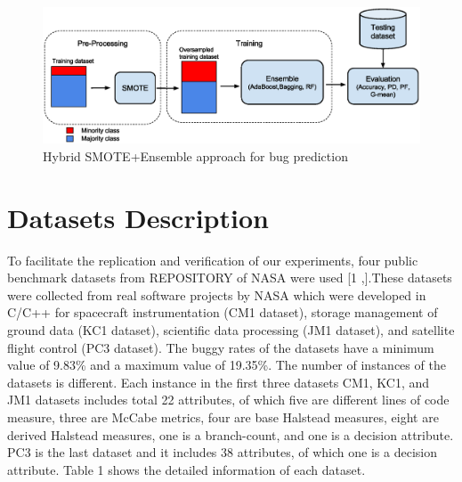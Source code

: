 \documentclass[runningheads,a4paper]{llncs}
\begin{document}
 \begin{figure}[h]
\label{fig:ss}
\begin{center}
\includegraphics[scale=0.45]{Framework.eps}
\caption{Hybrid SMOTE+Ensemble approach for bug prediction}
\end{center}
\label{fig:SMOTE+Ensemble}
\end{figure}


\section{Datasets Description}
\label{data}


To facilitate the replication and verification of our experiments, four public benchmark datasets from REPOSITORY of NASA were used [1 ,].These datasets were collected from real software projects by NASA which were developed in C/C++ for spacecraft instrumentation (CM1 dataset), storage management of ground data (KC1 dataset), scientific data processing (JM1 dataset), and satellite flight control (PC3 dataset). The buggy rates of the datasets have a minimum value of 9.83\% and a maximum value of 19.35\%. The number of instances of the datasets is different. Each instance in the first three datasets CM1, KC1, and JM1 datasets includes total 22 attributes, of which five are different lines of code measure, three are McCabe metrics, four are base Halstead measures, eight are derived Halstead measures, one is a branch-count, and one is a decision attribute. PC3 is the last dataset and it includes 38 attributes, of which one is a decision attribute. Table 1 shows the detailed information of each dataset.
\end{document}

